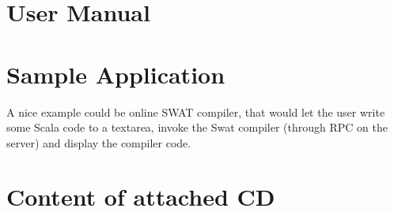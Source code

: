 \documentclass[12pt,a4paper]{report}
\begin{document}
\appendix
\appendixpage
\addappheadtotoc

\chapter{User Manual}

\chapter{Sample Application}

A nice example could be online SWAT compiler, that would let the user write some Scala code to a textarea, invoke the Swat compiler (through RPC on the server) and display the compiler code.



\chapter{Content of attached CD}





\printnomenclature
\end{document}
